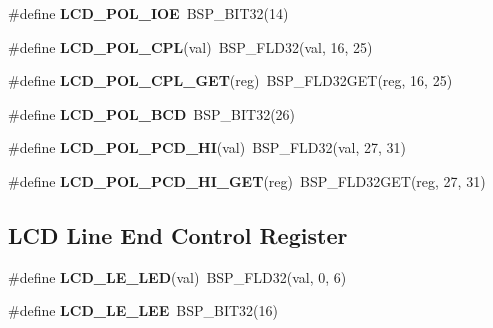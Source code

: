\begin{DoxyCompactItemize}
\#define {\bfseries L\+C\+D\+\_\+\+P\+O\+L\+\_\+\+I\+OE}~B\+S\+P\+\_\+\+B\+I\+T32(14)
\item 
\mbox{\label{group__lpc__lcd_ga5696ef7f5f5005ed2b0cb6806e719844}} 
\#define {\bfseries L\+C\+D\+\_\+\+P\+O\+L\+\_\+\+C\+PL}(val)~B\+S\+P\+\_\+\+F\+L\+D32(val, 16, 25)
\item 
\mbox{\label{group__lpc__lcd_gaa5089ae428f5bef838c808aabe4c3538}} 
\#define {\bfseries L\+C\+D\+\_\+\+P\+O\+L\+\_\+\+C\+P\+L\+\_\+\+G\+ET}(reg)~B\+S\+P\+\_\+\+F\+L\+D32\+G\+ET(reg, 16, 25)
\item 
\mbox{\label{group__lpc__lcd_ga4d38d3ef8c1f48c5ca96ac67bbbedc5b}} 
\#define {\bfseries L\+C\+D\+\_\+\+P\+O\+L\+\_\+\+B\+CD}~B\+S\+P\+\_\+\+B\+I\+T32(26)
\item 
\mbox{\label{group__lpc__lcd_ga7752fe6e394e0fa996359d9255812472}} 
\#define {\bfseries L\+C\+D\+\_\+\+P\+O\+L\+\_\+\+P\+C\+D\+\_\+\+HI}(val)~B\+S\+P\+\_\+\+F\+L\+D32(val, 27, 31)
\item 
\mbox{\label{group__lpc__lcd_gac99999520af34fe0a3797905600867fb}} 
\#define {\bfseries L\+C\+D\+\_\+\+P\+O\+L\+\_\+\+P\+C\+D\+\_\+\+H\+I\+\_\+\+G\+ET}(reg)~B\+S\+P\+\_\+\+F\+L\+D32\+G\+ET(reg, 27, 31)
\end{DoxyCompactItemize}
\subsection*{L\+CD Line End Control Register}
\begin{DoxyCompactItemize}
\item 
\mbox{\label{group__lpc__lcd_gaf65ae05cb50fc13c83d1a6cf174fafa1}} 
\#define {\bfseries L\+C\+D\+\_\+\+L\+E\+\_\+\+L\+ED}(val)~B\+S\+P\+\_\+\+F\+L\+D32(val, 0, 6)
\item 
\mbox{\label{group__lpc__lcd_ga60690839ffd7090da9a4c77a8cbac373}} 
\#define {\bfseries L\+C\+D\+\_\+\+L\+E\+\_\+\+L\+EE}~B\+S\+P\+\_\+\+B\+I\+T32(16)
\end{DoxyCompactItemize}
